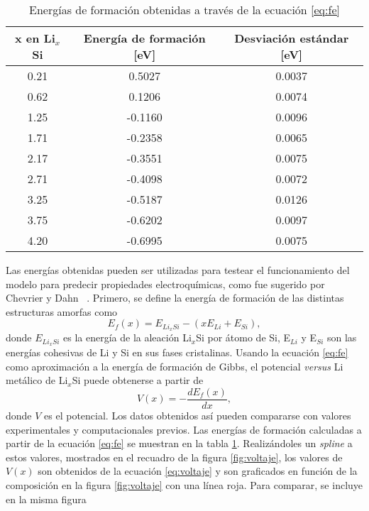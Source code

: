 \begin{table}[h]
    \centering
    \caption{Energías de formación obtenidas a través de la ecuación \ref{eq:fe}}
    \begin{tabular}{ccc}
    \hline
    x en Li$_x$Si & Energía de formación [eV] & Desviación estándar [eV]\\
    \hline
    0.21  &  0.5027  &  0.0037 \\
    0.62  &  0.1206  &  0.0074 \\
    1.25  & -0.1160  &  0.0096 \\
    1.71  & -0.2358  &  0.0065 \\
    2.17  & -0.3551  &  0.0075 \\
    2.71  & -0.4098  &  0.0072 \\
    3.25  & -0.5187  &  0.0126 \\
    3.75  & -0.6202  &  0.0097 \\
    4.20  & -0.6995  &  0.0075 \\
    \hline
    \end{tabular}
    \label{t:fe}
\end{table}
Las energías obtenidas pueden ser utilizadas para testear el funcionamiento del 
modelo para predecir propiedades electroquímicas, como fue sugerido por Chevrier
y Dahn ~\cite{chevrier2009}. Primero, se define la energía de formación de las 
distintas estructuras amorfas como
\begin{equation}\label{eq:fe}
    E_f(x) = E_{Li_xSi} - (x E_{Li} + E_{Si}),
\end{equation}
donde $E_{Li_xSi}$ es la energía de la aleación Li$_x$Si por átomo de Si, E$_{Li}$
y E$_{Si}$ son las energías cohesivas de Li y Si en sus fases cristalinas. Usando
la ecuación \ref{eq:fe} como aproximación a la energía de formación de Gibbs, el 
potencial \textit{versus} Li metálico de Li$_x$Si puede obtenerse a partir de
\begin{equation}\label{eq:voltaje}
    V(x) = - \frac{dE_f(x)}{dx},
\end{equation}
donde $V$ es el potencial. Los datos obtenidos así pueden compararse con valores
experimentales y computacionales previos. Las energías de formación calculadas
a partir de la ecuación \ref{eq:fe} se muestran en la tabla \ref{t:fe}. 
Realizándoles un \textit{spline} a estos valores, mostrados en el recuadro de la
figura \ref{fig:voltaje}, los valores de $V(x)$ son obtenidos de la ecuación
\ref{eq:voltaje} y son graficados en función de la composición en la figura 
\ref{fig:voltaje} con una línea roja. Para comparar, se incluye en la misma figura
